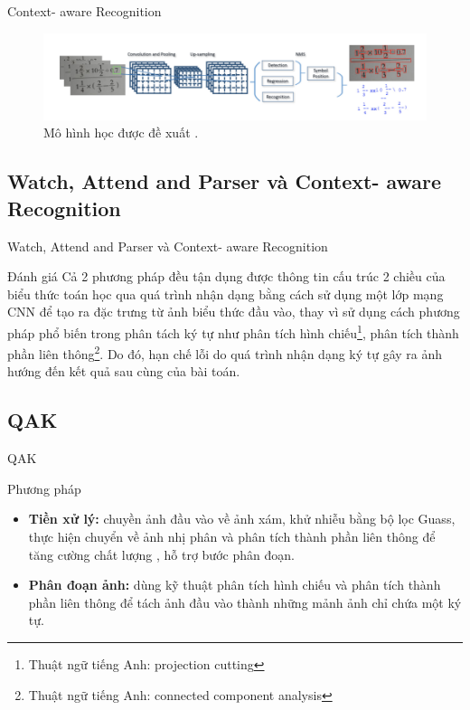 \documentclass{beamer}
\begin{document}
	\begin{frame}{Context- aware Recognition}
		\begin{figure}[!h]
			\centering
			\includegraphics[width=0.9\linewidth]{context_aware.png}
			\vspace{0.2cm}
			\caption{Mô hình học được đề xuất .}
		\end{figure}
	\end{frame}
	\subsection{Watch, Attend and Parser và Context- aware Recognition}
	\begin{frame}{Watch, Attend and Parser và Context- aware Recognition}
		\begin{block}{Đánh giá}
			Cả 2 phương pháp đều tận dụng được thông tin cấu trúc 2 chiều của biểu thức toán học qua quá trình nhận dạng bằng cách sử dụng một lớp mạng CNN để tạo ra đặc trưng từ ảnh biểu thức đầu vào, thay vì sử dụng cách phương pháp phổ biến trong phân tách ký tự như phân tích hình chiếu\footnote{Thuật ngữ tiếng Anh: projection cutting}, phân tích thành phần liên thông\footnote{Thuật ngữ tiếng Anh: connected component analysis}. Do đó, hạn chế lỗi do quá trình nhận dạng ký tự gây ra ảnh hướng đến kết quả sau cùng của bài toán.
		\end{block}
	\end{frame}
	\subsection{QAK}
	\begin{frame}{QAK}
		\begin{block}{Phương pháp}
			\begin{itemize}
				\item \textbf{Tiền xử lý:} chuyền ảnh đầu vào về ảnh xám, khử nhiễu bằng bộ lọc Guass, thực hiện chuyển về ảnh nhị phân và phân tích thành phần liên thông để tăng cường chất lượng , hỗ trợ bước phân đoạn.
				\item \textbf{Phân đoạn ảnh:} dùng kỹ thuật phân tích hình chiếu và phân tích thành phần liên thông để tách ảnh đầu vào thành những mảnh ảnh chỉ chứa một ký tự.
			\end{itemize}
		\end{block}
	\end{frame}
	
\end{document}
